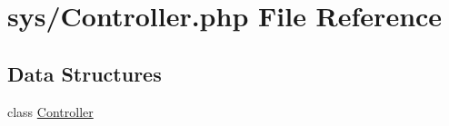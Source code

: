 \hypertarget{_controller_8php}{}\section{sys/\+Controller.php File Reference}
\label{_controller_8php}
\subsection*{Data Structures}
\begin{DoxyCompactItemize}
\item 
class \hyperlink{class_controller}{Controller}
\end{DoxyCompactItemize}
